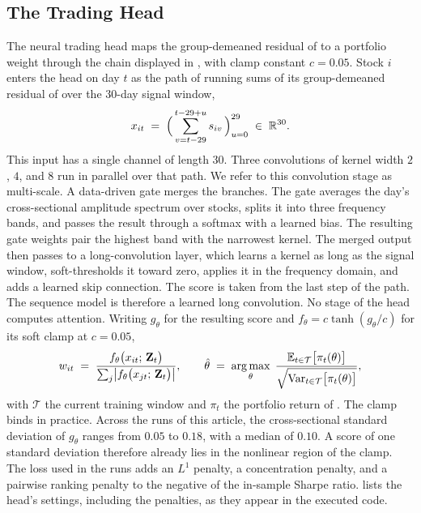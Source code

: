 
\subsection{The Trading Head}
\label{app:head}

The neural trading head maps the group-demeaned residual of  to a portfolio weight through the chain displayed in , with clamp constant $c = 0.05$. Stock $i$ enters the head on day $t$ as the path of running
sums of its group-demeaned residual of  over the 30-day signal window,
%
\begin{equation}\label{eq:headinput}
  x_{it} \;=\; \Bigl(\,\sum_{v=t-29}^{t-29+u} s_{iv}\,\Bigr)_{u=0}^{29}
  \;\in\; \mathbb{R}^{30}.
\end{equation}
%
This input has a single channel of length 30. Three
convolutions of kernel width $2$, $4$, and $8$ run in parallel over
that path. We refer to this convolution stage as multi-scale. A data-driven gate merges the branches. The gate averages the day's cross-sectional amplitude spectrum over stocks, splits it into three frequency bands, and passes the result through a softmax with a learned bias. The resulting gate weights pair the highest band with the narrowest kernel. The merged
output then passes to a long-convolution layer, which learns a kernel as long as
the signal window, soft-thresholds it toward zero, applies it in the
frequency domain, and adds a learned skip connection. The score is
taken from the last step of the path. The sequence
model is therefore a learned long convolution.
No stage of the head computes attention.
Writing $g_\theta$ for the resulting score and $f_\theta = c\tanh(g_\theta/c)$ for its soft clamp at $c = 0.05$,
%
\begin{equation}\label{eq:headw}
  w_{it} \;=\; \frac{f_\theta\bigl(x_{it};\, \mathbf{Z}_t\bigr)}
                    {\sum_{j} \bigl|f_\theta\bigl(x_{jt};\, \mathbf{Z}_t\bigr)\bigr|},
  \qquad
  \hat\theta \;=\; \operatorname*{arg\,max}_{\theta}\;
  \frac{\mathbb{E}_{t \in \mathcal{T}}\bigl[\pi_t(\theta)\bigr]}
       {\sqrt{\mathrm{Var}_{t \in \mathcal{T}}\bigl[\pi_t(\theta)\bigr]}},
\end{equation}
%
with $\mathcal{T}$ the current training window and $\pi_t$ the portfolio return
of . The clamp binds in practice. Across the runs of this article, the cross-sectional standard deviation of $g_\theta$ ranges from $0.05$ to $0.18$, with a median of $0.10$. A score of one standard deviation therefore already lies in the nonlinear region of the clamp. The loss used in the runs adds
an $L^1$ penalty, a concentration penalty, and a pairwise ranking penalty to the negative of the in-sample Sharpe ratio.
 lists the head's settings, including the penalties, as they appear in the executed code.

